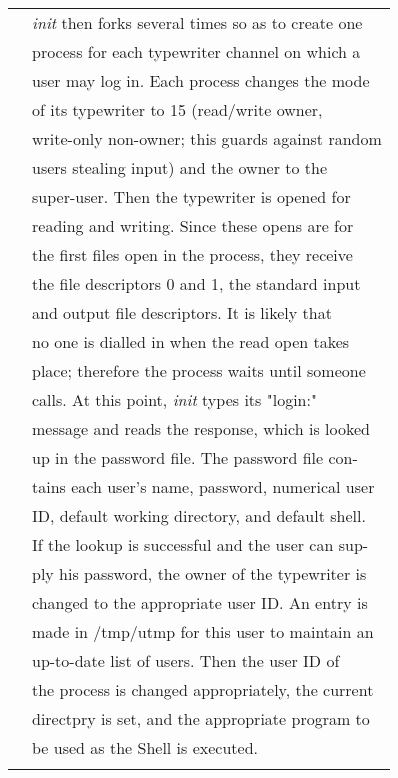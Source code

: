\documentclass{article}
\newenvironment{manpage}{\ttfamily}{\par}
\begin{document}
\begin{manpage}
\begin{longtable}{ll}
		& \textit{init} then forks several times so as to create one\\
		& process for each typewriter channel on which a\\
		& user may log in. Each process changes the mode\\
		& of its typewriter to 15 (read/write owner,\\
		& write-only non-owner; this guards against random\\
		& users stealing input) and the owner to the\\
		& super-user. Then the typewriter is opened for\\
		& reading and writing. Since these opens are for\\
		& the first files open in the process, they receive\\
		& the file descriptors 0 and 1, the standard input\\
		& and output file descriptors. It is likely that\\
		& no one is dialled in when the read open takes\\
		& place; therefore the process waits until someone\\
		& calls. At this point, \textit{init} types its "login:"\\
		& message and reads the response, which is looked\\
		& up in the password file. The password file con-\\
		& tains each user's name, password, numerical user\\
		& ID, default working directory, and default shell.\\
		& If the lookup is successful and the user can sup-\\
		& ply his password, the owner of the typewriter is\\
		& changed to the appropriate user ID. An entry is\\
		& made in /tmp/utmp for this user to maintain an\\
		& up-to-date list of users. Then the user ID of\\
		& the process is changed appropriately, the current\\
		& directpry is set, and the appropriate program to\\
		& be used as the Shell is executed.\\\\
		

\end{longtable}
\end{manpage}
\end{document}
